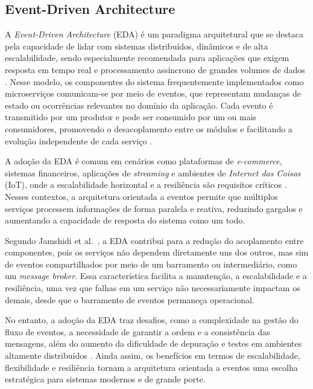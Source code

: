 \subsection{Event-Driven Architecture}
A \textit{Event-Driven Architecture} (EDA) é um paradigma arquitetural que se destaca pela capacidade de lidar com sistemas distribuídos, dinâmicos e de alta escalabilidade, sendo especialmente recomendada para aplicações que exigem resposta em tempo real e processamento assíncrono de grandes volumes de dados \cite{jamshidi2016systematic}. Nesse modelo, os componentes do sistema frequentemente implementados como microserviços comunicam-se por meio de eventos, que representam mudanças de estado ou ocorrências relevantes no domínio da aplicação. Cada evento é transmitido por um produtor e pode ser consumido por um ou mais consumidores, promovendo o desacoplamento entre os módulos e facilitando a evolução independente de cada serviço \cite{shekhar2023microservices}.

A adoção da EDA é comum em cenários como plataformas de \textit{e-commerce}, sistemas financeiros, aplicações de \textit{streaming} e ambientes de \textit{Internet das Coisas} (IoT), onde a escalabilidade horizontal e a resiliência são requisitos críticos \cite{jamshidi2016systematic, shekhar2023microservices}. Nesses contextos, a arquitetura orientada a eventos permite que múltiplos serviços processem informações de forma paralela e reativa, reduzindo gargalos e aumentando a capacidade de resposta do sistema como um todo.

Segundo Jamshidi et al.~\cite{jamshidi2016systematic}, a EDA contribui para a redução do acoplamento entre componentes, pois os serviços não dependem diretamente uns dos outros, mas sim de eventos compartilhados por meio de um barramento ou intermediário, como um \textit{message broker}. Essa característica facilita a manutenção, a escalabilidade e a resiliência, uma vez que falhas em um serviço não necessariamente impactam os demais, desde que o barramento de eventos permaneça operacional.

No entanto, a adoção da EDA traz desafios, como a complexidade na gestão do fluxo de eventos, a necessidade de garantir a ordem e a consistência das mensagens, além do aumento da dificuldade de depuração e testes em ambientes altamente distribuídos \cite{sha2023automating}. Ainda assim, os benefícios em termos de escalabilidade, flexibilidade e resiliência tornam a arquitetura orientada a eventos uma escolha estratégica para sistemas modernos e de grande porte.

